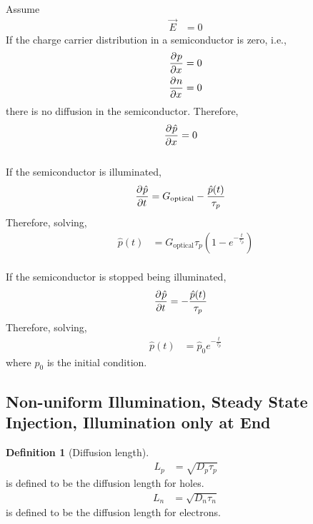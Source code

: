 \documentclass[titlepage, fleqn, a4paper, 12pt, twoside]{article}
\theoremstyle{definition}
\newtheorem{definition}{Definition}
\theoremstyle{theorem}
\let\Oldsubsection\subsection
\renewcommand{\subsection}{\FloatBarrier\Oldsubsection}
\begin{document}
Assume
\begin{align*}
	\overrightarrow{E} &= 0
\end{align*}
If the charge carrier distribution in a semiconductor is zero, i.e.,
\begin{align*}
	\dpd{p}{x} &= 0\\
	\dpd{n}{x} &= 0
\end{align*}
there is no diffusion in the semiconductor.
Therefore,
\begin{align*}
	\dpd{\hat{p}}{x} &= 0
\end{align*}
~\\
If the semiconductor is illuminated,
\begin{align*}
	\dpd{\hat{p}}{t} &= G_{\text{optical}} - \frac{\hat{p}(t)}{\tau_p}
\end{align*}
Therefore, solving,
\begin{align*}
	\hat{p}(t) &= G_{\text{optical}} \tau_{p} \left( 1 - e^{-\frac{t}{\tau_p}} \right)
\end{align*}
~\\
If the semiconductor is stopped being illuminated,
\begin{align*}
	\dpd{\hat{p}}{t} &= -\frac{\hat{p}(t)}{\tau_p}
\end{align*}
Therefore, solving,
\begin{align*}
	\hat{p}(t) &= \hat{p}_0 e^{-\frac{t}{\tau_p}}
\end{align*}
where $\hat{p}_0$ is the initial condition.

\subsection{Non-uniform Illumination, Steady State Injection, Illumination only at End}

\begin{definition}[Diffusion length]
	\begin{align*}
		L_p &= \sqrt{D_p \tau_p}
	\end{align*}
	is defined to be the diffusion length for holes.
	\begin{align*}
		L_n &= \sqrt{D_n \tau_n}
	\end{align*}
	is defined to be the diffusion length for electrons.
\end{definition}
\end{document}
